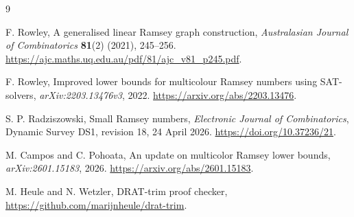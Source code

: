 \documentclass[11pt]{article}
\theoremstyle{definition}
\theoremstyle{remark}
\begin{document}
\begin{thebibliography}{9}
\raggedright

F. Rowley,
\newblock A generalised linear Ramsey graph construction,
\newblock \emph{Australasian Journal of Combinatorics} \textbf{81}(2)
(2021), 245--256.
\newblock \url{https://ajc.maths.uq.edu.au/pdf/81/ajc_v81_p245.pdf}.

F. Rowley,
\newblock Improved lower bounds for multicolour Ramsey numbers using
SAT-solvers,
\newblock \emph{arXiv:2203.13476v3}, 2022.
\newblock \url{https://arxiv.org/abs/2203.13476}.

S. P. Radziszowski,
\newblock Small Ramsey numbers,
\newblock \emph{Electronic Journal of Combinatorics}, Dynamic Survey DS1,
revision 18, 24 April 2026.
\newblock \url{https://doi.org/10.37236/21}.

M. Campos and C. Pohoata,
\newblock An update on multicolor Ramsey lower bounds,
\newblock \emph{arXiv:2601.15183}, 2026.
\newblock \url{https://arxiv.org/abs/2601.15183}.

M. Heule and N. Wetzler,
\newblock DRAT-trim proof checker,
\newblock \url{https://github.com/marijnheule/drat-trim}.

\end{thebibliography}
\end{document}
